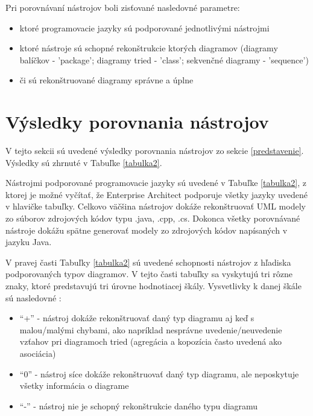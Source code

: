 \documentclass[10pt,twoside,slovak,a4paper]{article}
\begin{document}
Pri porovnávaní nástrojov boli zisťované nasledovné parametre:
\begin{itemize}
\item ktoré programovacie jazyky sú podporované jednotlivými nástrojmi
\item ktoré nástroje sú schopné rekonštrukcie ktorých diagramov (diagramy balíčkov - 'package'; diagramy tried - 'class'; sekvenčné diagramy - 'sequence')
\item či sú rekonštruované diagramy správne a úplne
\end{itemize}

\section{Výsledky porovnania nástrojov}\label{porovnanie}

V tejto sekcii sú uvedené výsledky porovnania nástrojov zo sekcie \ref{predstavenie}. Výsledky sú zhrnuté v Tabuľke \ref{tabulka2}.

Nástrojmi podporované programovacie jazyky sú uvedené v Tabuľke \ref{tabulka2}, z ktorej je možné vyčítať, že Enterprise Architect podporuje všetky jazyky uvedené v hlavičke tabuľky. Celkovo väčšina nástrojov dokáže rekonštruovať UML modely zo súborov zdrojových kódov typu .java, .cpp, .cs. Dokonca všetky porovnávané nástroje dokážu spätne generovať modely zo zdrojových kódov napísaných v jazyku Java.

V pravej časti Tabuľky \ref{tabulka2} sú uvedené schopnosti nástrojov z hľadiska podporovaných typov diagramov. V tejto časti tabuľky sa vyskytujú tri rôzne znaky, ktoré predstavujú tri úrovne hodnotiacej škály. Vysvetlivky k danej škále sú nasledovné \cite{Osman:RE}:
\begin{itemize}
\item ``+'' - nástroj dokáže rekonštruovať daný typ diagramu aj keď s malou/malými chybami, ako napríklad nesprávne uvedenie/neuvedenie vzťahov pri diagramoch tried (agregácia a kopozícia často uvedená ako asociácia)

\item ``0'' - nástroj síce dokáže rekonštruovať daný typ diagramu, ale neposkytuje všetky informácia o diagrame

\item ``-'' - nástroj nie je schopný rekonštrukcie daného typu diagramu

\end{itemize}
\end{document}
